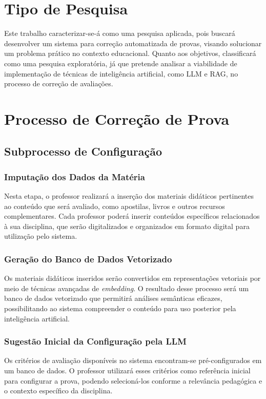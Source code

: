 \section{Tipo de Pesquisa}

Este trabalho caracterizar-se-á como uma pesquisa aplicada, pois buscará desenvolver um sistema para correção automatizada de provas, visando solucionar um problema prático no contexto educacional. Quanto aos objetivos, classificará como uma pesquisa exploratória, já que pretende analisar a viabilidade de implementação de técnicas de inteligência artificial, como LLM e RAG, no processo de correção de avaliações.

\section{Processo de Correção de Prova}

\subsection{Subprocesso de Configuração}

\subsubsection{Imputação dos Dados da Matéria}
Nesta etapa, o professor realizará a inserção dos materiais didáticos pertinentes ao conteúdo que será avaliado, como apostilas, livros e outros recursos complementares. Cada professor poderá inserir conteúdos específicos relacionados à sua disciplina, que serão digitalizados e organizados em formato digital para utilização pelo sistema.

\subsubsection{Geração do Banco de Dados Vetorizado}
Os materiais didáticos inseridos serão convertidos em representações vetoriais por meio de técnicas avançadas de \textit{embedding}. O resultado desse processo será um banco de dados vetorizado que permitirá análises semânticas eficazes, possibilitando ao sistema compreender o conteúdo para uso posterior pela inteligência artificial.

\subsubsection{Sugestão Inicial da Configuração pela LLM}
Os critérios de avaliação disponíveis no sistema encontram-se pré-configurados em um banco de dados. O professor utilizará esses critérios como referência inicial para configurar a prova, podendo selecioná-los conforme a relevância pedagógica e o contexto específico da disciplina.

